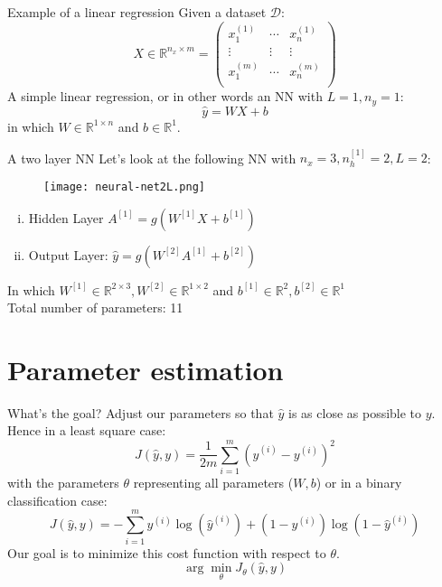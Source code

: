 \documentclass{beamer}
\begin{document}
\begin{frame}[t]{Example of a linear regression}
  Given a dataset $\mathcal{D}$:
  \begin{equation}
    X \in \mathbb{R}^{n_x \times m}  = 
    \begin{pmatrix}
      x^{(1)}_1 & \cdots & x^{(1)}_n \\
      \vdots & \vdots & \vdots \\
      x^{(m)}_1 & \cdots & x^{(m)}_n \\
    \end{pmatrix}
  \end{equation}
  A simple linear regression, or in other words an NN with $L=1, n_y=1$:
  \begin{equation}
    \hat{y} = WX+b
  \end{equation}
  in which $W \in \mathbb{R}^{1 \times n}$ and $b \in \mathbb{R}^{1}$.
\end{frame}

\begin{frame}[t]{A two layer NN}
  \small
  Let's look at the following NN with $n_x=3, n_h^{[1]} = 2, L=2$:
  \begin{figure}[htpb]
    \centering
    \texttt{[image: neural-net2L.png]}
  \end{figure}
  \begin{enumerate}[(i)]
    \item Hidden Layer $A^{[1]} = g(W^{[1]}X + b^{[1]})$
    \item Output Layer: $\hat{y} = g(W^{[2]}A^{[1]} + b^{[2]})$
  \end{enumerate}
  In which $W^{[1]} \in \mathbb{R}^{2\times 3}, W^{[2]} \in \mathbb{R}^{1 \times 2}$ and
  $b^{[1]} \in \mathbb{R}^{2}, b^{[2]} \in \mathbb{R}^{1}$ \\
  Total number of parameters: 11
\end{frame}

\section{Parameter estimation}
\label{sec:the_basics}

\begin{frame}[t]{What's the goal?}
  Adjust our parameters so that $\hat{y}$ is as close as possible to $y$. Hence in a least square case:
  \begin{equation}
    J(\hat{y}, y) = \frac{1}{2m} \sum^m_{i=1} {(\hat{y}^{(i)} - y^{(i)})}^2
  \end{equation}
  with the parameters $\theta$ representing all parameters ($W, b$) or in a binary classification case:
  \begin{equation}
    J(\hat{y}, y) = - \sum^m_{i=1} y^{(i)}\log(\hat{y}^{(i)}) + (1- y^{(i)})\log(1-\hat{y}^{(i)})
  \end{equation}
  Our goal is to minimize this cost function with respect to $\theta$.
  \begin{equation}
    \arg\min_\theta{J_\theta(\hat{y}, y)}
  \end{equation}
\end{frame}
\end{document}
